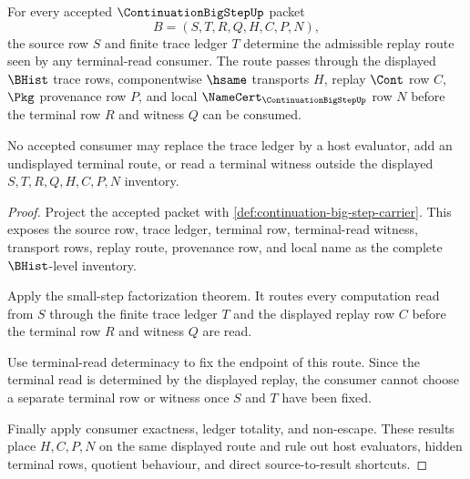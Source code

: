 \begin{theorem}
\label{thm:continuation-bigstep-source-trace-lock}
For every accepted $\ContinuationBigStepUp$ packet
$$
B=(S,T,R,Q,H,C,P,N),
$$
the source row $S$ and finite trace ledger $T$ determine the admissible replay route seen by any terminal-read consumer. The route passes through the displayed $\BHist$ trace rows, componentwise $\hsame$ transports $H$, replay $\Cont$ row $C$, $\Pkg$ provenance row $P$, and local $\NameCert_{\ContinuationBigStepUp}$ row $N$ before the terminal row $R$ and witness $Q$ can be consumed.

No accepted consumer may replace the trace ledger by a host evaluator, add an undisplayed terminal route, or read a terminal witness outside the displayed $S,T,R,Q,H,C,P,N$ inventory.
\end{theorem}
\begin{proof}
Project the accepted packet with \autoref{def:continuation-big-step-carrier}. This exposes the source row, trace ledger, terminal row, terminal-read witness, transport rows, replay route, provenance row, and local name as the complete $\BHist$-level inventory.

Apply the small-step factorization theorem. It routes every computation read from $S$ through the finite trace ledger $T$ and the displayed replay row $C$ before the terminal row $R$ and witness $Q$ are read.

Use terminal-read determinacy to fix the endpoint of this route. Since the terminal read is determined by the displayed replay, the consumer cannot choose a separate terminal row or witness once $S$ and $T$ have been fixed.

Finally apply consumer exactness, ledger totality, and non-escape. These results place $H,C,P,N$ on the same displayed route and rule out host evaluators, hidden terminal rows, quotient behaviour, and direct source-to-result shortcuts.
\end{proof}

